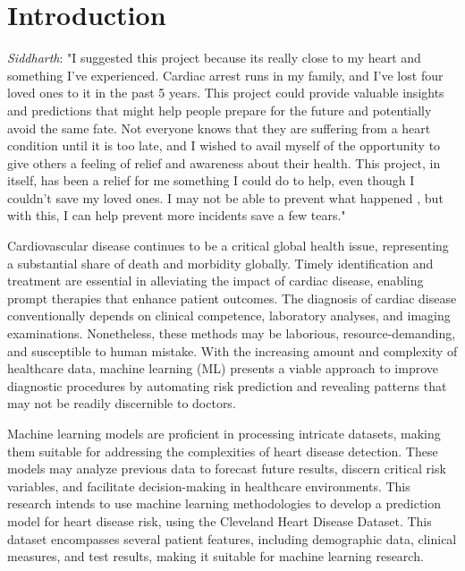
\section{Introduction}
\textit{Siddharth}: "I suggested this project because its really close to my heart and something I've experienced. Cardiac arrest runs in my family, and I’ve lost four loved ones to it in the past 5 years. This project could provide valuable insights and predictions that might help people prepare for the future and potentially avoid the same fate. Not everyone knows that they are suffering from a heart condition until it is too late, and I wished to avail myself of the opportunity to give others a feeling of relief and awareness about their health. This project, in itself, has been a relief for me something I could do to help, even though I couldn't save my loved ones. I may not be able to prevent what happened , but with this, I can help prevent more incidents save a few tears." 

Cardiovascular disease continues to be a critical global health issue, representing a substantial share of death and morbidity globally. Timely identification and treatment are essential in alleviating the impact of cardiac disease, enabling prompt therapies that enhance patient outcomes. The diagnosis of cardiac disease conventionally depends on clinical competence, laboratory analyses, and imaging examinations. Nonetheless, these methods may be laborious, resource-demanding, and susceptible to human mistake. With the increasing amount and complexity of healthcare data, machine learning (ML) presents a viable approach to improve diagnostic procedures by automating risk prediction and revealing patterns that may not be readily discernible to doctors.

Machine learning models are proficient in processing intricate datasets, making them suitable for addressing the complexities of heart disease detection. These models may analyze previous data to forecast future results, discern critical risk variables, and facilitate decision-making in healthcare environments. This research intends to use machine learning methodologies to develop a prediction model for heart disease risk, using the Cleveland Heart Disease Dataset. This dataset encompasses several patient features, including demographic data, clinical measures, and test results, making it suitable for machine learning research.

